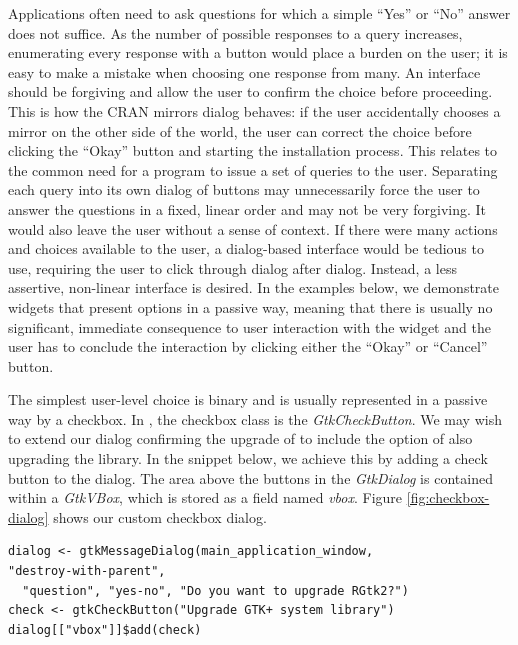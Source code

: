 \documentclass[article]{jss}
\begin{document}
Applications often need to ask questions for which a simple ``Yes'' or
``No'' answer does not suffice. As the number of possible responses to
a query increases, enumerating every response with a button would
place a burden on the user; it is easy to make a mistake when choosing
one response from many. An interface should be forgiving and allow the
user to confirm the choice before proceeding.  This is how the CRAN
mirrors dialog behaves: if the user accidentally chooses a mirror on
the other side of the world, the user can correct the choice before
clicking the ``Okay'' button and starting the installation
process. This relates to the common need for a program to issue a set
of queries to the user. Separating each query into its own dialog of
buttons may unnecessarily force the user to answer the questions in a
fixed, linear order and may not be very forgiving. It would also leave
the user without a sense of context. If there were many actions and
choices available to the user, a dialog-based interface would be
tedious to use, requiring the user to click through dialog after
dialog. Instead, a less assertive, non-linear interface is desired. In
the examples below, we demonstrate widgets that present options in a
passive way, meaning that there is usually no significant, immediate
consequence to user interaction with the widget and the user has to
conclude the interaction by clicking either the ``Okay'' or ``Cancel''
button.

The simplest user-level choice is binary and is usually represented in
a passive
way by a checkbox. In , the checkbox class is the
\emph{GtkCheckButton}. We may wish to extend our dialog confirming the
upgrade of  to include the option of also upgrading the
 library. In the snippet below, we achieve this by adding a
check button to the dialog.  The area above the buttons in the
\emph{GtkDialog} is contained within a \emph{GtkVBox}, which is stored
as a field named \emph{vbox}. Figure \ref{fig:checkbox-dialog} shows
our custom checkbox dialog.
\begin{verbatim}
dialog <- gtkMessageDialog(main_application_window,
"destroy-with-parent", 
  "question", "yes-no", "Do you want to upgrade RGtk2?")
check <- gtkCheckButton("Upgrade GTK+ system library")
dialog[["vbox"]]$add(check)
\end{verbatim}
\end{document}
